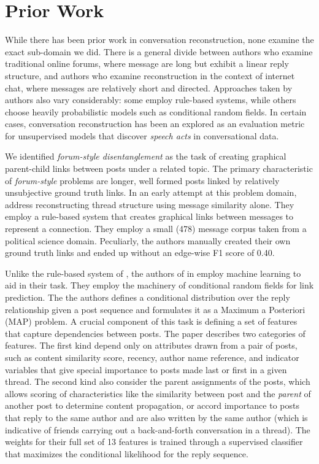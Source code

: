 \documentclass{article}
\begin{document}
\section{Prior Work}
\label{sec:prior_work}
While there has been prior work in conversation reconstruction, none examine
the exact sub-domain we did. There is a general divide between authors
who examine traditional online forums, where message are long but exhibit a linear
reply structure, and authors who examine reconstruction in the context of internet chat, 
where messages are relatively short and directed. Approaches taken by authors also vary considerably:
some employ rule-based systems, while others choose heavily probabilistic models such as conditional
random fields. In certain cases, conversation reconstruction has been an explored as an evaluation metric 
for unsupervised models that discover \textit{speech acts} in conversational data.

We identified \textit{forum-style disentanglement} as the task of creating 
graphical parent-child links between posts under a related topic. The primary characteristic 
of \textit{forum-style} problems are longer, well formed posts 
linked by relatively unsubjective ground truth links. In an early
attempt at this problem domain, \cite{Wang2008a} address reconstructing
thread structure using message similarity alone. They employ a rule-based
system that creates graphical links between messages to represent a connection.
They employ a small (478) message corpus taken from a political science domain. 
Peculiarly, the authors manually created their own ground truth links and ended
up without an edge-wise F1 score of 0.40.

Unlike the rule-based system of \cite{Wang2008a}, the authors of 
in \cite{Wang2011a} employ machine learning to aid in their task. They employ
the machinery of conditional random fields for link prediction.
The the authors defines a conditional distribution over the reply
relationship given a post sequence and formulates it as a Maximum a Posteriori
(MAP) problem. A crucial component of this task is defining a set of features
that capture dependencies between posts. The paper describes two categories of
features. The first kind depend only on attributes drawn from a pair
of posts, such as content similarity score, recency, author name reference, and
indicator variables that give special importance to posts made last or first in
a given thread. The second kind also consider the parent assignments of
the posts, which allows scoring of characteristics like the
similarity between  post and the \emph{parent} of another post to determine
content propagation, or accord importance to posts that reply to the same author
and are also written by the same author (which is indicative of friends carrying
out a back-and-forth conversation in a thread). The weights for their full set of
13 features is trained through a supervised classifier that maximizes the
conditional likelihood for the reply sequence.
\end{document}
